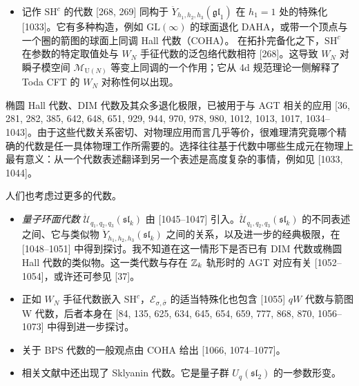 \begin{itemize}[leftmargin=1.4em,itemsep=4pt]
  \item 记作 $\mathrm{SH}^c$ 的代数 [268, 269] 同构于 $\ddot Y_{h_1,h_2,h_3}(\mathfrak{gl}_1)$ 在 $h_1=1$ 处的特殊化 [1033]。它有多种构造，例如 $\mathrm{GL}(\infty)$ 的球面退化 DAHA，或带一个顶点与一个圈的箭图的球面上同调 Hall 代数（COHA）。
  在拓扑完备化之下，$\mathrm{SH}^c$ 在参数的特定取值处与 $W_N$ 手征代数的泛包络代数相符 [268]。这导致 $W_N$ 对瞬子模空间 $\mathcal{M}_{\mathrm{U}(N)}$ 等变上同调的一个作用；它从 4d 规范理论一侧解释了 Toda CFT 的 $W_N$ 对称性何以出现。
\end{itemize}

椭圆 Hall 代数、DIM 代数及其众多退化极限，已被用于与 AGT 相关的应用 [36, 281, 282, 385, 642, 648, 651, 929, 944, 970, 978, 980, 1012, 1013, 1017, 1034--1043]。由于这些代数关系密切、对物理应用而言几乎等价，很难理清究竟哪个精确的代数是任一具体物理工作所需要的。选择往往基于代数中哪些生成元在物理上最有意义：从一个代数表述翻译到另一个表述是高度复杂的事情，例如见 [1033, 1044]。

人们也考虑过更多的代数。
\begin{itemize}[leftmargin=1.4em,itemsep=4pt]
  \item \emph{量子环面代数} $\ddot{\mathcal U}_{q_1,q_2,q_3}(\mathfrak{sl}_k)$ 由 [1045--1047] 引入。$\ddot{\mathcal U}_{q_1,q_2,q_3}(\mathfrak{sl}_k)$ 的不同表述之间、它与类似物 $\ddot Y_{h_1,h_2,h_3}(\mathfrak{sl}_k)$ 之间的关系，以及进一步的经典极限，在 [1048--1051] 中得到探讨。我不知道在这一情形下是否已有 DIM 代数或椭圆 Hall 代数的类似物。这一类代数与存在 $\mathbb{Z}_k$ 轨形时的 AGT 对应有关 [1052--1054]，或许还可参见 [37]。

  \item 正如 $W_N$ 手征代数嵌入 $\mathrm{SH}^c$，$\mathcal{E}_{\sigma,\bar\sigma}$ 的适当特殊化也包含 [1055] $qW$ 代数与箭图 W 代数，后者本身在 [84, 135, 625, 634, 645, 654, 659, 777, 868, 870, 1056--1073] 中得到进一步探讨。

  \item 关于 BPS 代数的一般观点由 COHA 给出 [1066, 1074--1077]。

  \item 相关文献中还出现了 Sklyanin 代数。它是量子群 $U_q(\mathfrak{sl}_2)$ 的一参数形变。
\end{itemize}

